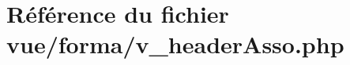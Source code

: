 \hypertarget{v__header_asso_8php}{}\section{Référence du fichier vue/forma/v\+\_\+header\+Asso.php}
\label{v__header_asso_8php}
